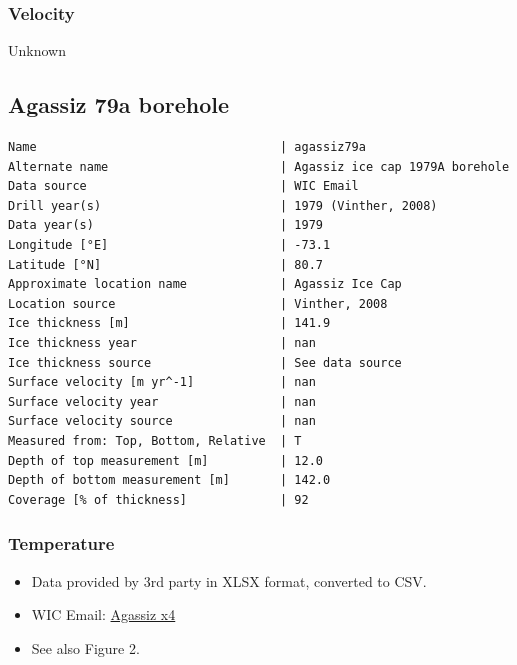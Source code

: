 \documentclass[article,a4paper,times,11pt,twoside]{article}
\begin{document}
\subsubsection{Velocity}
\label{sec:org1043400}

Unknown
\clearpage
\subsection{Agassiz 79a borehole}
\label{sec:org9b72749}
\begin{verbatim}
Name                                  | agassiz79a
Alternate name                        | Agassiz ice cap 1979A borehole 
Data source                           | WIC Email 
Drill year(s)                         | 1979 (Vinther, 2008)
Data year(s)                          | 1979 
Longitude [°E]                        | -73.1 
Latitude [°N]                         | 80.7 
Approximate location name             | Agassiz Ice Cap 
Location source                       | Vinther, 2008
Ice thickness [m]                     | 141.9 
Ice thickness year                    | nan 
Ice thickness source                  | See data source 
Surface velocity [m yr^-1]            | nan 
Surface velocity year                 | nan 
Surface velocity source               | nan 
Measured from: Top, Bottom, Relative  | T 
Depth of top measurement [m]          | 12.0 
Depth of bottom measurement [m]       | 142.0 
Coverage [% of thickness]             | 92 
\end{verbatim}


\subsubsection{Temperature}
\label{sec:org01d2854}

\begin{itemize}
\item Data provided by 3rd party in XLSX format, converted to CSV.
\item WIC Email: \href{msgid:AM0PR04MB6129DE88C9253A951702EE06A2F30@AM0PR04MB6129.eurprd04.prod.outlook.com}{Agassiz x4}
\item See also \textcite{clarke_1987_wind} Figure 2.
\end{itemize}
\end{document}

